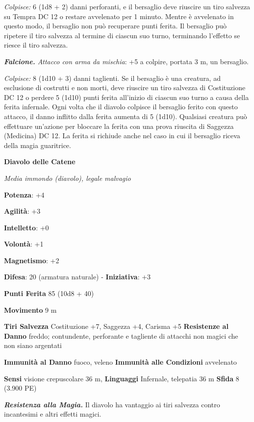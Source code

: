 \begin{multicols}{2}
\emph{Colpisce:} 6 (1d8 + 2) danni perforanti, e il bersaglio deve
riuscire un tiro salvezza su Tempra DC 12 o restare avvelenato per
1 minuto. Mentre è avvelenato in questo modo, il bersaglio non può
recuperare punti ferita. Il bersaglio può ripetere il tiro salvezza al
termine di ciascun suo turno, terminando l'effetto se riesce il tiro
salvezza.

\emph{\textbf{Falcione.} Attacco con arma da mischia}: +5 a colpire,
portata 3 m, un bersaglio.

\emph{Colpisce:} 8 (1d10 + 3) danni taglienti. Se il bersaglio è una
creatura, ad esclusione di costrutti e non morti, deve riuscire un tiro
salvezza di Costituzione DC 12 o perdere 5 (1d10) punti ferita
all'inizio di ciascun suo turno a causa della ferita infernale. Ogni
volta che il diavolo colpisce il bersaglio ferito con questo attacco, il
danno inflitto dalla ferita aumenta di 5 (1d10). Qualsiasi creatura può
effettuare un'azione per bloccare la ferita con una prova riuscita di
Saggezza (Medicina) DC 12. La ferita si richiude anche nel caso in cui
il bersaglio riceva della magia guaritrice.



\textbf{Diavolo delle Catene}

\emph{Media immondo (diavolo), legale malvagio}

\textbf{Potenza}: +4

\textbf{Agilità}: +3

\textbf{Intelletto}: +0

\textbf{Volontà}: +1

\textbf{Magnetismo}: +2

\textbf{Difesa}: 20 (armatura naturale) - \textbf{Iniziativa}: +3

\textbf{Punti Ferita} 85 (10d8 + 40)

\textbf{Movimento} 9 m

\textbf{Tiri Salvezza} Costituzione +7, Saggezza +4, Carisma +5
\textbf{Resistenze al Danno} freddo; contundente, perforante e tagliente
di attacchi non magici che non siano argentati

\textbf{Immunità al Danno} fuoco, veleno \textbf{Immunità alle
Condizioni} avvelenato

\textbf{Sensi} visione crepuscolare 36 m, 
\textbf{Linguaggi} Infernale, telepatia 36 m \textbf{Sfida} 8 (3.900 PE)

\emph{\textbf{Resistenza alla Magia.}} Il diavolo ha vantaggio ai tiri
salvezza contro incantesimi e altri effetti magici.


\end{multicols}

